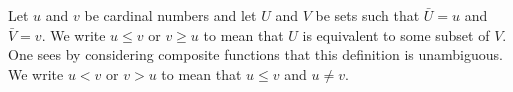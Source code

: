 Let $u$ and $v$ be cardinal numbers and let $U$ and $V$ be sets such that $\bar{U} = u$ and $\bar{V} = v$. We write $u \leq v$ or $v \geq u$ to mean that $U$ is equivalent to some subset of $V$. One sees by considering composite functions that this definition is unambiguous. We write $u < v$ or $v > u$ to mean that $u \leq v$ and $u \neq v$.